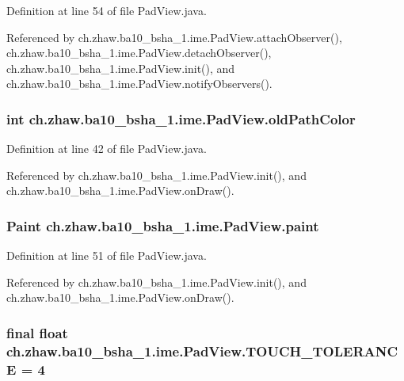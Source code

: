 Definition at line 54 of file PadView.java.

Referenced by ch.zhaw.ba10\_\-bsha\_\-1.ime.PadView.attachObserver(), ch.zhaw.ba10\_\-bsha\_\-1.ime.PadView.detachObserver(), ch.zhaw.ba10\_\-bsha\_\-1.ime.PadView.init(), and ch.zhaw.ba10\_\-bsha\_\-1.ime.PadView.notifyObservers().\hypertarget{classch_1_1zhaw_1_1ba10__bsha__1_1_1ime_1_1PadView_ac399fffb0a2e777ca6089ad4e713e76c}{
\subsubsection[{oldPathColor}]{\setlength{\rightskip}{0pt plus 5cm}int {\bf ch.zhaw.ba10\_\-bsha\_\-1.ime.PadView.oldPathColor}}}
\label{classch_1_1zhaw_1_1ba10__bsha__1_1_1ime_1_1PadView_ac399fffb0a2e777ca6089ad4e713e76c}


Definition at line 42 of file PadView.java.

Referenced by ch.zhaw.ba10\_\-bsha\_\-1.ime.PadView.init(), and ch.zhaw.ba10\_\-bsha\_\-1.ime.PadView.onDraw().\hypertarget{classch_1_1zhaw_1_1ba10__bsha__1_1_1ime_1_1PadView_a1122cb9b4a18be3bb5f96d56dea23ad6}{
\subsubsection[{paint}]{\setlength{\rightskip}{0pt plus 5cm}Paint {\bf ch.zhaw.ba10\_\-bsha\_\-1.ime.PadView.paint}}}
\label{classch_1_1zhaw_1_1ba10__bsha__1_1_1ime_1_1PadView_a1122cb9b4a18be3bb5f96d56dea23ad6}


Definition at line 51 of file PadView.java.

Referenced by ch.zhaw.ba10\_\-bsha\_\-1.ime.PadView.init(), and ch.zhaw.ba10\_\-bsha\_\-1.ime.PadView.onDraw().\hypertarget{classch_1_1zhaw_1_1ba10__bsha__1_1_1ime_1_1PadView_a5fa1919707284dc6019fbc707998b7fe}{
\subsubsection[{TOUCH\_\-TOLERANCE}]{\setlength{\rightskip}{0pt plus 5cm}final float {\bf ch.zhaw.ba10\_\-bsha\_\-1.ime.PadView.TOUCH\_\-TOLERANCE} = 4}}
\label{classch_1_1zhaw_1_1ba10__bsha__1_1_1ime_1_1PadView_a5fa1919707284dc6019fbc707998b7fe}


